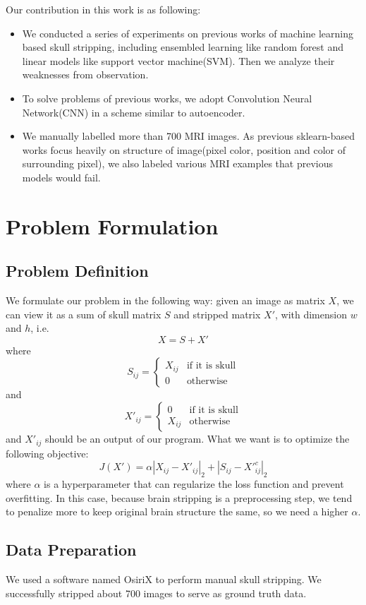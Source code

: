 \documentclass[conference]{IEEEtran}
\begin{document}
Our contribution in this work is as following:
\begin{itemize}
\item We conducted a series of experiments on previous works of machine learning based skull stripping, including ensembled learning like random forest and linear models like support vector machine(SVM). Then we analyze their weaknesses from observation. 
\item To solve problems of previous works, we adopt Convolution Neural Network(CNN) in a scheme similar to autoencoder. 
\item We manually labelled more than 700 MRI images. As previous sklearn-based works focus heavily on structure of image(pixel color, position and color of surrounding pixel), we also labeled various MRI examples that previous models would fail. 
\end{itemize}

\section{Problem Formulation}
\subsection*{Problem Definition}
We formulate our problem in the following way: given an image as matrix $X$, we can view it as a sum of skull matrix $S$ and stripped matrix $X'$, with dimension $w$ and $h$, i.e.
\[
X = S + X'
\]
where
\[
S_{ij} = 
\begin{cases}
X_{ij} &\text{if it is skull} \\
0 &\text{otherwise}
\end{cases}
\]
and 
\[
X'_{ij} = 
\begin{cases}
0 &\text{if it is skull} \\
X_{ij} &\text{otherwise}
\end{cases}
\]
and $X'_{ij}$ should be an output of our program. What we want is to optimize the following objective: 
\begin{equation}
\label{loss}
J(X') = \alpha{|X_{ij} -X'_{ij}|_2} + |S_{ij} - X'^c_{ij}|_2
\end{equation}
where $\alpha$ is a hyperparameter that can regularize the loss function and prevent overfitting. In this case, because brain stripping is a preprocessing step, we tend to penalize more to keep original brain structure the same, so we need a higher $\alpha$. 

\subsection{Data Preparation}
We used a software named OsiriX to perform manual skull stripping. We successfully stripped about 700 images to serve as ground truth data.
\end{document}
